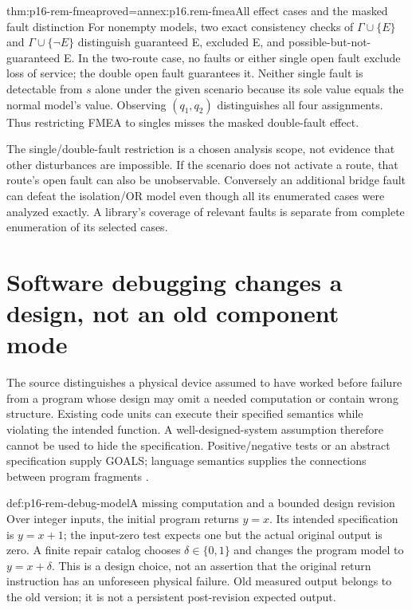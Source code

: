 \begin{hbtheorem}{thm:p16-rem-fmea}{proved=annex:p16.rem-fmea}{All effect cases and the masked fault distinction}
For nonempty models, two exact consistency checks of \(\Gamma\cup\{E\}\)
and \(\Gamma\cup\{\neg E\}\) distinguish guaranteed E, excluded E,
and possible-but-not-guaranteed E. In the two-route case, no faults or
either single open fault exclude loss of service; the double open fault
guarantees it. Neither single fault is detectable from \(s\) alone under
the given scenario because its sole value equals the normal model's value.
Observing \((q_1,q_2)\) distinguishes all four assignments. Thus restricting
FMEA to singles misses the masked double-fault effect.
\end{hbtheorem}

The single/double-fault restriction is a chosen analysis scope, not evidence
that other disturbances are impossible. If the scenario does not activate
a route, that route's open fault can also be unobservable. Conversely an
additional bridge fault can defeat the isolation/OR model even though all
its enumerated cases were analyzed exactly. A library's coverage of relevant
faults is separate from complete enumeration of its selected cases.

\section{Software debugging changes a design, not an old component mode}
\label{sec:p16-rem-debugging}

The source distinguishes a physical device assumed to have worked before
failure from a program whose design may omit a needed computation or contain
wrong structure. Existing code units can execute their specified semantics
while violating the intended function. A well-designed-system assumption
therefore cannot be used to hide the specification. Positive/negative tests
or an abstract specification supply GOALS; language semantics supplies the
connections between program fragments
\cite[pp.~456--458]{Struss2008ModelBasedProblemSolving}.

\begin{hbdefinition}{def:p16-rem-debug-model}{A missing computation and a bounded design revision}
Over integer inputs, the initial program returns \(y=x\). Its intended
specification is \(y=x+1\); the input-zero test expects one but the
actual original output is zero. A finite repair catalog chooses
\(\delta\in\{0,1\}\) and changes the program model to
\(y=x+\delta\). This is a design choice, not an assertion that the
original return instruction has an unforeseen physical failure.
Old measured output belongs to the old version; it is not a persistent
post-revision expected output.
\end{hbdefinition}

